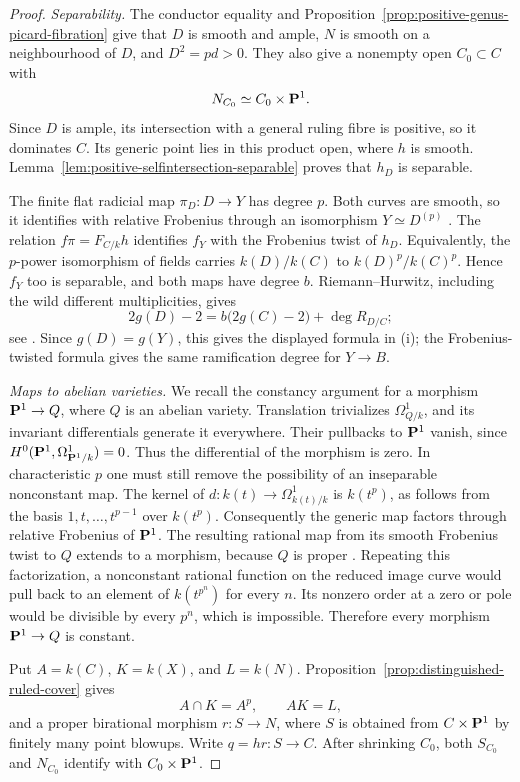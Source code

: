 \begin{proof}
\emph{Separability.}
The conductor equality and
Proposition~\ref{prop:positive-genus-picard-fibration} give that
$D$ is smooth and ample, $N$ is smooth on a neighbourhood of $D$,
and $D^2=pd>0$. They also give a nonempty open $C_0\subset C$
with
\[
 N_{C_0}\simeq C_0\times\mathbf P^1.
\]
Since $D$ is ample, its intersection with a general ruling fibre
is positive, so it dominates $C$. Its generic point lies in this
product open, where $h$ is smooth.
Lemma~\ref{lem:positive-selfintersection-separable} proves that
$h_D$ is separable.

The finite flat radicial map $\pi_D:D\to Y$ has degree $p$.
Both curves are smooth, so it identifies with relative Frobenius
through an isomorphism $Y\simeq D^{(p)}$
\cite[Tag~0CCY]{Stacks}. The relation
$f\pi=F_{C/k}h$ identifies $f_Y$ with the Frobenius twist of
$h_D$. Equivalently, the $p$-power isomorphism of fields carries
$k(D)/k(C)$ to $k(D)^p/k(C)^p$.
Hence $f_Y$ too is separable, and both maps have degree $b$.
Riemann--Hurwitz, including the wild different multiplicities,
gives
\[
 2g(D)-2=b\bigl(2g(C)-2\bigr)+\deg R_{D/C};
\]
see \cite[Tag~0C1B, Lemma~53.12.2 and its preceding proof]{Stacks}.
Since $g(D)=g(Y)$, this gives the displayed formula in (i);
the Frobenius-twisted formula gives the same ramification degree
for $Y\to B$.

\emph{Maps to abelian varieties.}
We recall the constancy argument for a morphism
$\mathbf P^1\to Q$, where $Q$ is an abelian variety.
Translation trivializes $\Omega^1_{Q/k}$, and its invariant
differentials generate it everywhere. Their pullbacks to
$\mathbf P^1$ vanish, since $H^0(\mathbf P^1,\Omega^1_{\mathbf P^1/k})=0$.
Thus the differential of the morphism is zero.
In characteristic $p$ one must still remove the possibility
of an inseparable nonconstant map.
The kernel of
$d:k(t)\to\Omega^1_{k(t)/k}$ is $k(t^p)$, as follows from
the basis $1,t,\ldots,t^{p-1}$ over $k(t^p)$.
Consequently the generic map factors through relative Frobenius
of $\mathbf P^1$. The resulting rational map from its smooth
Frobenius twist to $Q$ extends to a morphism, because $Q$ is
proper \cite[Tag~0BXZ]{Stacks}.
Repeating this factorization, a nonconstant rational function
on the reduced image curve would pull back to an element of
$k(t^{p^n})$ for every $n$. Its nonzero order at a zero or pole
would be divisible by every $p^n$, which is impossible.
Therefore every morphism $\mathbf P^1\to Q$ is constant.

Put $A=k(C)$, $K=k(X)$, and $L=k(N)$.
Proposition~\ref{prop:distinguished-ruled-cover} gives
\[
 A\cap K=A^p,\qquad AK=L,
\]
and a proper birational morphism $r:S\to N$, where $S$ is
obtained from $C\times\mathbf P^1$ by finitely many point blowups.
Write $q=hr:S\to C$. After shrinking $C_0$, both
$S_{C_0}$ and $N_{C_0}$ identify with $C_0\times\mathbf P^1$.


\end{proof}
